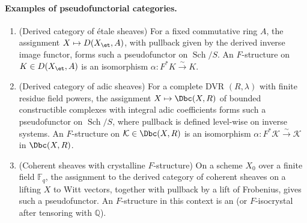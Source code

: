 \begin{definition}
    \paragraph{Examples of pseudofunctorial categories.}
    \begin{enumerate}
        \item (Derived category of \'etale sheaves) For a fixed commutative ring $A$, the assignment $X \mapsto D(X_{\et}, A)$, with pullback given by the derived inverse image functor, forms such a pseudofunctor on $\operatorname{Sch}/S$. An $F$-structure on $K \in D(X_{\et}, A)$ is an isomorphism $\alpha: F^*K \xrightarrow{\sim} K$.
        \item (Derived category of adic sheaves) For a complete DVR $(R, \lambda)$ with finite residue field powers, the assignment $X \mapsto \Dbc(X, R)$ of bounded constructible complexes with integral adic coefficients forms such a pseudofunctor on $\operatorname{Sch}/S$, where pullback is defined level-wise on inverse systems. An $F$-structure on $\mathcal{K} \in \Dbc(X, R)$ is an isomorphism $\alpha: F^*\mathcal{K} \xrightarrow{\sim} \mathcal{K}$ in $\Dbc(X, R)$.
        \item (Coherent sheaves with crystalline $F$-structure) On a scheme $X_0$ over a finite field $\mathbb{F}_q$, the assignment to the derived category of coherent sheaves on a lifting $X$ to Witt vectors, together with pullback by a lift of Frobenius, gives such a pseudofunctor. An $F$-structure in this context is an  (or $F$-isocrystal after tensoring with $\mathbb{Q}$).
    \end{enumerate}
\end{definition}
